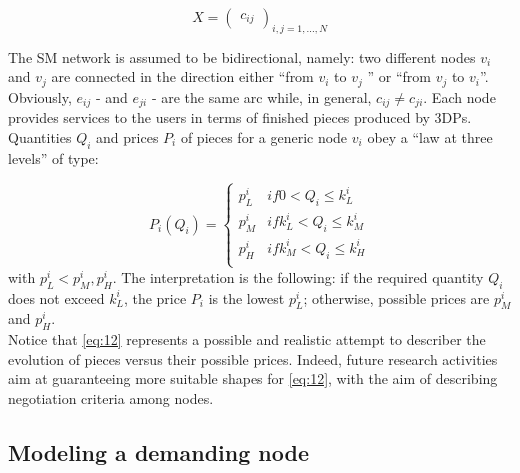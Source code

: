 \begin{equation}
    \label{eq:11}
    X = \begin{pmatrix}c_{ij}\end{pmatrix}_{i,j=1,...,N}
\end{equation}

The SM network is assumed to be bidirectional, namely: two different nodes $v_i$ and $v_j$ are connected in the direction either “from $v_i$ to $v_j$ ” or “from $v_j$ to $v_i$”. Obviously, $e_{ij}$ - and $e_{ji}$ - are the same arc while, in general, $c_{ij} \neq c_{ji}$.
Each node provides services to the users in terms of finished pieces produced by 3DPs. Quantities $Q_i$ and prices $P_i$ of pieces for a generic node $v_i$ obey a “law at three levels” of type:

\begin{equation}
    \label{eq:12}
    P_i(Q_i) = 
    \begin{cases} 
        p^i_L & if  0 < Q_i \leq k^i_L \\
        p^i_M & if  k^i_L  < Q_i \leq k^i_M \\
        p^i_H & if  k^i_M  < Q_i \leq k^i_H \\
    \end{cases}
\end{equation}
with $p^i_L<p^i_M,p^i_H$. The interpretation is the following: if the required quantity $Q_i$ does not exceed $k^i_L$, the price $P_i$ is the lowest $p^i_L$; otherwise, possible prices are $p^i_M$ and $p^i_H$.\\
Notice that \ref{eq:12} represents a possible and realistic attempt to describer the evolution of pieces versus their possible prices. Indeed, future research activities aim at guaranteeing more suitable shapes for \ref{eq:12}, with the aim of describing negotiation criteria among nodes.

\subsection{Modeling a demanding node}

